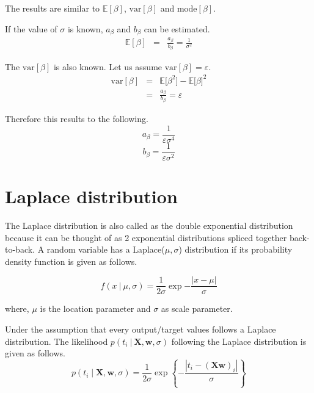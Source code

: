 \documentclass[11pt]{article}
\newcommand{\mean}[1]{\mathbb{E}\left[#1\right]}
\newcommand\given[1][]{\:#1\vert\:}
\begin{document}
The results are similar to $\mean{\beta}$, $\text{var}\left[\beta\right]$ and $\text{mode}\left[\beta\right]$.

If the value of $\sigma$ is known, $a_{\beta}$ and $b_{\beta}$ can be estimated.
\begin{eqnarray}
    \mean{\beta} &=& \frac{a_{\beta}}{b_{\beta}} = \frac{1}{\sigma^2}
\end{eqnarray}

The $\text{var}\left[\beta\right]$ is also known. Let us assume $\text{var}\left[\beta\right] = \varepsilon$.
\begin{eqnarray}
    \text{var}\left[\beta\right]
    &=& \mathbb{E}\big[\beta^2\big] - \mathbb{E}\big[\beta\big]^2 \\
    &=& \frac{a_{\beta}}{b_{\beta}} = \varepsilon
\end{eqnarray}

Therefore this results to the following.
\begin{equation}
    a_{\beta} = \frac{1}{\varepsilon\sigma^4}
\end{equation}
\begin{equation}
    b_{\beta} = \frac{1}{\varepsilon\sigma^2}
\end{equation}

\section{Laplace distribution}

The Laplace distribution is also called as the double exponential distribution because it can be thought of as 2 exponential distributions spliced together back-to-back. A random variable has a Laplace($\mu, \sigma$) distribution if its probability density function is given as follows.

\begin{equation}
    f(x \given \mu, \sigma) = \frac{1}{2\sigma}\exp{-\frac{\left\lvert x - \mu \right\rvert}{\sigma}}
\end{equation}

where, $\mu$ is the location parameter and $\sigma$ as scale parameter. 

Under the assumption that every output/target values follows a Laplace distribution. The likelihood  $p(t_i \given \bm{X}, \bm{w}, \sigma)$ following the Laplace distribution is given as follows.
\begin{equation}
    p(t_i \mid \bm{X}, \bm{w}, \sigma) = \frac{1}{2\sigma}\exp\left\{{-\frac{\left\lvert t_i - (\bm{X w})_i \right\lvert}{\sigma}}\right\}
\end{equation}
\end{document}
